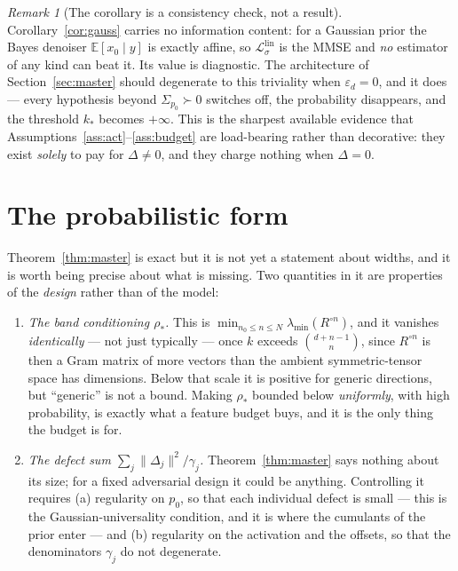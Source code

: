 \documentclass[11pt]{article}
\theoremstyle{remark}
\newtheorem{remark}{Remark}
\newcommand{\E}{\mathbb{E}}
\newcommand{\Sig}{\Sigma_{p_0}}
\newcommand{\lmin}{\lambda_{\min}}
\begin{document}
\begin{remark}[The corollary is a consistency check, not a result]\label{rem:trivial}
Corollary~\ref{cor:gauss} carries no information content: for a Gaussian prior the Bayes denoiser $\E[x_0\mid y]$ is exactly affine, so $\mathcal L^{\mathrm{lin}}_\sigma$ is the MMSE and \emph{no} estimator of any kind can beat it. Its value is diagnostic. The architecture of Section~\ref{sec:master} should degenerate to this triviality when $\varepsilon_d = 0$, and it does --- every hypothesis beyond $\Sig \succ 0$ switches off, the probability disappears, and the threshold $k_*$ becomes $+\infty$. This is the sharpest available evidence that Assumptions~\ref{ass:act}--\ref{ass:budget} are load-bearing rather than decorative: they exist \emph{solely} to pay for $\Delta \ne 0$, and they charge nothing when $\Delta = 0$.
\end{remark}

\part{The probabilistic form}

\noindent Theorem~\ref{thm:master} is exact but it is not yet a statement about widths, and it is worth being precise about what is missing. Two quantities in it are properties of the \emph{design} rather than of the model:

\begin{enumerate}
\item[(1)] \emph{The band conditioning $\rho_*$.} This is $\min_{n_0\le n\le N}\lmin(R^{\circ n})$, and it vanishes \emph{identically} --- not just typically --- once $k$ exceeds $\binom{d+n-1}{n}$, since $R^{\circ n}$ is then a Gram matrix of more vectors than the ambient symmetric-tensor space has dimensions. Below that scale it is positive for generic directions, but ``generic'' is not a bound. Making $\rho_*$ bounded below \emph{uniformly}, with high probability, is exactly what a feature budget buys, and it is the only thing the budget is for.
\item[(2)] \emph{The defect sum $\sum_j \lVert\Delta_j\rVert^2/\gamma_j$.} Theorem~\ref{thm:master} says nothing about its size; for a fixed adversarial design it could be anything. Controlling it requires (a) regularity on $p_0$, so that each individual defect is small --- this is the Gaussian-universality condition, and it is where the cumulants of the prior enter --- and (b) regularity on the activation and the offsets, so that the denominators $\gamma_j$ do not degenerate.
\end{enumerate}
\end{document}
